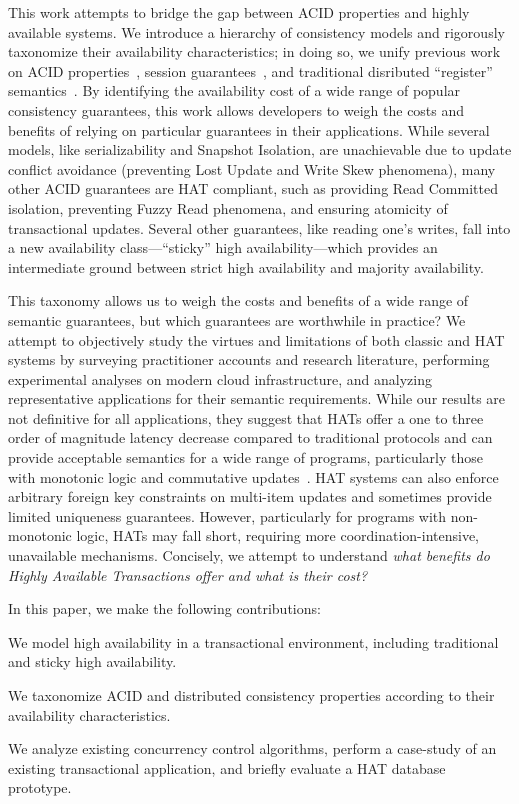 This work attempts to bridge the gap between ACID properties and
highly available systems. We introduce a hierarchy of consistency
models and rigorously taxonomize their availability characteristics;
in doing so, we unify previous work on ACID properties~\cite{adya},
session guarantees~\cite{sessionguarantees}, and traditional
disributed ``register'' semantics~\cite{herlihy-art}. By identifying
the availability cost of a wide range of popular consistency
guarantees, this work allows developers to weigh the costs and
benefits of relying on particular guarantees in their applications. While
several models, like serializability and Snapshot Isolation, are
unachievable due to update conflict avoidance (preventing Lost Update
and Write Skew phenomena), many other ACID guarantees are HAT
compliant, such as providing Read Committed isolation, preventing
Fuzzy Read phenomena, and ensuring atomicity of transactional
updates. Several other guarantees, like reading one's writes, fall
into a new availability class---``sticky'' high availability---which
provides an intermediate ground between strict high availability and
majority availability.

This taxonomy allows us to weigh the costs and benefits of a wide
range of semantic guarantees, but which guarantees are worthwhile in
practice? We attempt to objectively study the virtues and limitations
of both classic and HAT systems by surveying practitioner accounts and
research literature, performing experimental analyses on modern cloud
infrastructure, and analyzing representative applications for their
semantic requirements. While our results are not definitive for all
applications, they suggest that HATs offer a one to three order of
magnitude latency decrease compared to traditional protocols and can
provide acceptable semantics for a wide range of programs,
particularly those with monotonic logic and commutative
updates~\cite{calm, blooml, crdt}. HAT systems can also enforce
arbitrary foreign key constraints on multi-item updates and sometimes
provide limited uniqueness guarantees. However, particularly for
programs with non-monotonic logic, HATs may fall short, requiring more
coordination-intensive, unavailable mechanisms. Concisely, we attempt
to understand \textit{what benefits do Highly Available Transactions
  offer and what is their cost?}

In this paper, we make the following contributions:
\begin{myitemize}
\item We model high availability in a transactional environment,
  including traditional and sticky high availability.

\item We taxonomize ACID and distributed consistency properties
  according to their availability characteristics.

\item We analyze existing concurrency control algorithms, perform a
  case-study of an existing transactional application, and
  briefly evaluate a HAT database prototype.
\end{myitemize}

